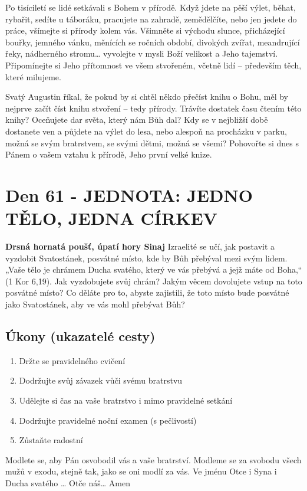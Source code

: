 \documentclass[11pt]{article}
\newcommand{\zacatekDevatyTyden}{
\textbf{Drsná hornatá poušť, úpatí hory Sinaj} \newline 
Izraelité se učí, jak postavit a vyzdobit Svatostánek, posvátné místo, kde by Bůh přebýval mezi svým lidem. „Vaše tělo je chrámem Ducha svatého, který ve vás přebývá a jejž máte od Boha,“ (1 Kor 6,19). Jak vyzdobujete svůj chrám? Jakým věcem dovolujete vstup na toto posvátné místo? Co děláte pro to, abyste zajistili, že toto místo bude posvátné jako Svatostánek, aby ve vás mohl přebývat Bůh?

\subsection*{Úkony (ukazatelé cesty)}
\begin{enumerate}
  \item Držte se pravidelného cvičení
  \item Dodržujte svůj závazek vůči svému bratrstvu
  \item Udělejte si čas na vaše bratrstvo i mimo pravidelné setkání
  \item Dodržujte pravidelné noční examen (s pečlivostí)
  \item Zůstaňte radostní
\end{enumerate}
Modlete se, aby Pán osvobodil vás a vaše bratrství. \newline
Modleme se za svobodu všech mužů v exodu, stejně tak, jako se oni modlí za vás.\newline
Ve jménu Otce i Syna i Ducha svatého …  Otče náš… Amen
}
\begin{document}
Po tisíciletí se lidé setkávali s Bohem v přírodě. Když jdete na pěší výlet, běhat, rybařit, sedíte u táboráku, pracujete na
zahradě, zemědělčíte, nebo jen jedete do práce, všímejte si přírody kolem vás. Všimněte si východu slunce, přicházející
bouřky, jemného vánku, měnících se ročních období, divokých zvířat, meandrující řeky, nádherného stromu…
vyvolejte v mysli Boží velikost a Jeho tajemství. Připomínejte si Jeho přítomnost ve všem stvořeném, včetně lidí –
především těch, které milujeme.

Svatý Augustin říkal, že pokud by si chtěl někdo přečíst knihu o Bohu, měl by nejprve začít číst knihu stvoření – tedy
přírody. Trávíte dostatek času čtením této knihy? Oceňujete dar světa, který nám Bůh dal? Kdy se v nejbližší době
dostanete ven a půjdete na výlet do lesa, nebo alespoň na procházku v parku, možná se svým bratrstvem, se svými
dětmi, možná se všemi? Pohovořte si dnes s Pánem o vašem vztahu k přírodě, Jeho první velké knize.


\newpage
\section{Den 61 - JEDNOTA: JEDNO TĚLO, JEDNA CÍRKEV}
\zacatekDevatyTyden
\end{document}
